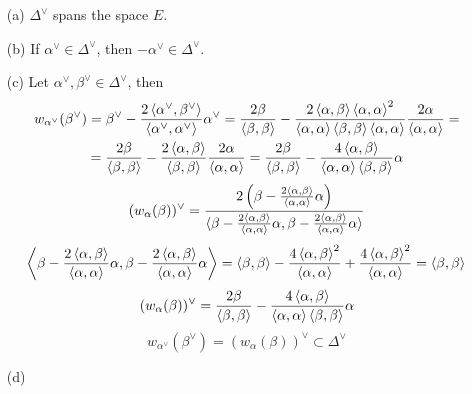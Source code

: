 \documentclass[12pt]{article}
\theoremstyle{definition}
\begin{document}
\begin{enumerate}
\begin{itemize}
        \begin{itemize}
            \item[(a)] $\Delta^\vee$ spans the space $E$.
            \item[(b)] If $\alpha^\vee\in\Delta^\vee$, then $-\alpha^\vee\in\Delta^\vee$.
            \item[(c)] Let $\alpha^\vee,\beta^\vee\in\Delta^\vee$, then
            \begin{multline}
                w_{\alpha^\vee}(\beta^\vee)=\beta^\vee-\frac{2\braket{\alpha^\vee,\beta^\vee}}{\braket{\alpha^\vee,\alpha^\vee}}\alpha^\vee=\frac{2\beta}{\braket{\beta,\beta}}-\frac{2\braket{\alpha,\beta}\braket{\alpha,\alpha}^2}{\braket{\alpha,\alpha}\braket{\beta,\beta}\braket{\alpha,\alpha}}\frac{2\alpha}{\braket{\alpha,\alpha}}=\\=\frac{2\beta}{\braket{\beta,\beta}}-\frac{2\braket{\alpha,\beta}}{\braket{\beta,\beta}}\frac{2\alpha}{\braket{\alpha,\alpha}}=\frac{2\beta}{\braket{\beta,\beta}}-\frac{4\braket{\alpha,\beta}}{\braket{\alpha,\alpha}\braket{\beta,\beta}}\alpha
            \end{multline}
            \begin{equation}
                (w_\alpha(\beta))^\vee=\frac{2\left(\beta-\frac{2\braket{\alpha,\beta}}{\braket{\alpha,\alpha}}\alpha\right)}{\braket{\beta-\frac{2\braket{\alpha,\beta}}{\braket{\alpha,\alpha}}\alpha,\beta-\frac{2\braket{\alpha,\beta}}{\braket{\alpha,\alpha}}\alpha}}
            \end{equation}
            \begin{equation}
                \left<\beta-\frac{2\braket{\alpha,\beta}}{\braket{\alpha,\alpha}}\alpha,\beta-\frac{2\braket{\alpha,\beta}}{\braket{\alpha,\alpha}}\alpha\right>=\braket{\beta,\beta}-\frac{4\braket{\alpha,\beta}^2}{\braket{\alpha,\alpha}}+\frac{4\braket{\alpha,\beta}^2}{\braket{\alpha,\alpha}}=\braket{\beta,\beta}
            \end{equation}
            \begin{equation}
                (w_\alpha(\beta))^\vee=\frac{2\beta}{\braket{\beta,\beta}}-\frac{4\braket{\alpha,\beta}}{\braket{\alpha,\alpha}\braket{\beta,\beta}}\alpha
            \end{equation}
            \begin{equation}
                w_{\alpha^\vee}(\beta^\vee)=(w_\alpha(\beta))^\vee\subset\Delta^\vee
            \end{equation}
            \item[(d)]
            \begin{equation}

\end{equation}
\end{itemize}
\end{itemize}
\end{enumerate}
\end{document}
